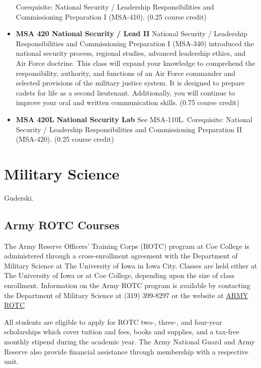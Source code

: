 \documentclass[
  letterpaper,
]{scrbook}
\begin{document}
\begin{itemize}
  Corequisite: National Security / Leadership Responsibilities and
  Commissioning Preparation I (MSA-410). (0.25 course credit)
\item
  \textbf{MSA 420 National Security / Lead II} National Security /
  Leadership Responsibilities and Commissioning Preparation I (MSA-340)
  introduced the national security process, regional studies, advanced
  leadership ethics, and Air Force doctrine. This class will expand your
  knowledge to comprehend the responsibility, authority, and functions
  of an Air Force commander and selected provisions of the military
  justice system. It is designed to prepare cadets for life as a second
  lieutenant. Additionally, you will continue to improve your oral and
  written communication skills. (0.75 course credit)
\item
  \textbf{MSA 420L National Security Lab} See MSA-110L. Corequisite:
  National Security / Leadership Responsibilities and Commissioning
  Preparation II (MSA-420). (0.25 course credit)
\end{itemize}

\hypertarget{military-science}{%
\section{Military Science}\label{military-science}}

Guderski.

\hypertarget{army-rotc-courses}{%
\subsection{Army ROTC Courses}\label{army-rotc-courses}}

The Army Reserve Officers' Training Corps (ROTC) program at Coe College
is administered through a cross-enrollment agreement with the Department
of Military Science at The University of Iowa in Iowa City. Classes are
held either at The University of Iowa or at Coe College, depending upon
the size of class enrollment. Information on the Army ROTC program is
available by contacting the Department of Military Science at (319)
399-8297 or the website at
\href{http://armyrotc.com/edu/univia/index.htm}{ARMY ROTC}

All students are eligible to apply for ROTC two-, three-, and four-year
scholarships which cover tuition and fees, books and supplies, and a
tax-free monthly stipend during the academic year. The Army National
Guard and Army Reserve also provide financial assistance through
membership with a respective unit.
\end{document}
